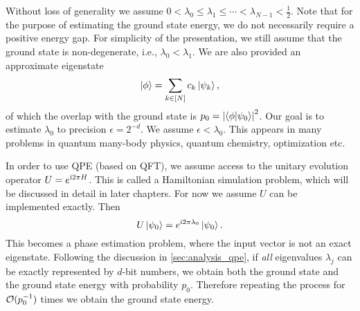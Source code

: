Without loss of generality we assume $0<\lambda_0\le\lambda_1\le \cdots  <\lambda_{N-1}<\frac12$. Note that for the purpose of estimating the ground state energy, we do not necessarily require a positive energy gap. 
For simplicity of the presentation, we still assume that the ground state is non-degenerate, i.e., $\lambda_0<\lambda_1$. 
We are also provided an approximate eigenstate
\begin{equation}
\ket{\phi}=\sum_{k\in[N]} c_k \ket{\psi_k},
\end{equation}
of which the overlap with the ground state is  $p_0=\left\lvert\braket{\phi|\psi_0}\right\rvert^2$. Our goal is to estimate $\lambda_0$ to precision $\epsilon=2^{-d}$. We  assume $\epsilon<\lambda_0$. This appears in many problems in quantum many-body physics, quantum chemistry, optimization etc.

In order to use QPE (based on QFT), we assume access to the unitary evolution operator $U=e^{\mathrm{i} 2\pi H}$. This is called a Hamiltonian simulation problem, which will be discussed in detail in later chapters.
For now we assume $U$ can be implemented exactly.
Then
\begin{displaymath}
U\ket{\psi_0}=e^{\mathrm{i} 2\pi \lambda_0}\ket{\psi_0}.
\end{displaymath}
This becomes a phase estimation problem, where the input vector is not an exact eigenstate. 
Following the discussion in \cref{sec:analysis_qpe}, if \emph{all} eigenvalues $\lambda_j$ can be exactly represented by $d$-bit numbers, we obtain both the ground state and the ground state energy with probability $p_0$.
Therefore repeating the process for $\mathcal{O}(p_0^{-1})$ times we obtain the ground state energy.

